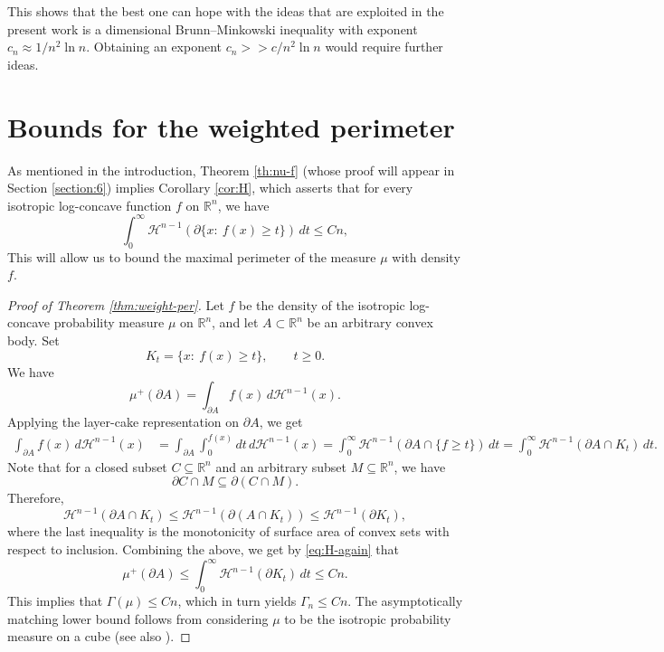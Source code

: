 \documentclass[11pt,leqno]{article}
\theoremstyle{definition}
\theoremstyle{remark}
\numberwithin{equation}{section}
\newcommand{\ls}{\leqslant}
\newcommand{\gr}{\geqslant}
\newcommand{\1}{\textbf{1}}
\newcommand{\R}{\mathbb{R}}
\begin{document}
This shows that the best one can hope with the ideas that are exploited in the present work is a dimensional Brunn--Minkowski inequality with 
exponent $c_n\approx 1/n^2\ln n$. Obtaining an exponent $c_n >\!\!\!> c/n^2 \ln n$  would require further 
ideas.


\section{Bounds for the weighted perimeter}\label{section:4}

As mentioned in the introduction, Theorem \ref{th:nu-f} (whose proof will appear in Section \ref{section:6}) implies Corollary \ref{cor:H}, which asserts that for every 
isotropic log-concave function $f$ on $\mathbb{R}^n$, we have
\begin{equation} \label{eq:H-again}
\int_0^\infty \mathcal{H}^{n-1}(\partial \{x: \ f(x)\gr t\}) \, dt \ls Cn, 
\end{equation}
This will allow us to bound the maximal perimeter of the measure $\mu$ with density $f$.

\begin{proof} [Proof of Theorem \ref{thm:weight-per}]Let $f$ be the density of the isotropic log-concave probability measure $\mu$ on $\R^n$, and let $A\subset\mathbb{R}^n$ be an arbitrary convex body. Set
$$K_t=\{x: \ f(x)\gr t\},\qquad t\gr 0.$$
We have
\begin{equation*}\label{eq:max-per-1}
\mu^+(\partial A) = \int_{\partial A} f(x)\,d\mathcal{H}^{n-1}(x).
\end{equation*}
Applying the layer-cake representation on $\partial A$, we get
\begin{align*}\label{eq:max-per-2}
\int_{\partial A} f(x)\,d\mathcal{H}^{n-1}(x)
&=\int_{\partial A} \int_0^{f(x)} dt\,d\mathcal{H}^{n-1}(x) =\int_0^{\infty}\mathcal{H}^{n-1}\left(\partial A\cap \{f\gr t\}\right)\,dt =\int_0^{\infty}\mathcal{H}^{n-1}(\partial A\cap K_t)\,dt.
\end{align*}
Note that for a closed subset $C\subseteq \R^n$ and an arbitrary subset $M\subseteq \R^n$, we have
$$\partial C \cap M \subseteq \partial (C\cap M).$$
Therefore,
$$\mathcal{H}^{n-1}(\partial A\cap K_t) \ls \mathcal{H}^{n-1}(\partial (A\cap K_t))\ls \mathcal{H}^{n-1}(\partial K_t),$$
where the last inequality is the monotonicity of surface area of convex sets with respect to inclusion. Combining the above, we get by \eqref{eq:H-again} that
$$\mu^+(\partial A) \ls \int_0^{\infty} \mathcal{H}^{n-1}(\partial K_t)\,dt\ls Cn.$$
This implies that $\Gamma(\mu) \leq Cn$, which in turn yields $\Gamma_n \leq Cn$. The asymptotically matching lower bound follows from considering $\mu$ to be the isotropic probability measure on a cube (see also \cite[Section~5]{BGHT}).
\end{proof}
\end{document}
